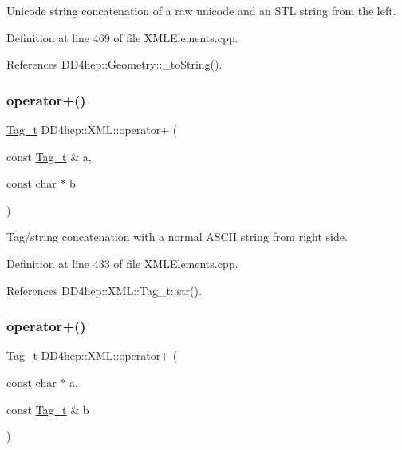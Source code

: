 Unicode string concatenation of a raw unicode and an S\+TL string from the left. 



Definition at line 469 of file X\+M\+L\+Elements.\+cpp.



References D\+D4hep\+::\+Geometry\+::\+\_\+to\+String().

\hypertarget{group___d_d4_h_e_p___x_m_l_gacf5fdc46e1dad4d2935283ead3a4c0fd}{}\label{group___d_d4_h_e_p___x_m_l_gacf5fdc46e1dad4d2935283ead3a4c0fd} 
\subsubsection{\texorpdfstring{operator+()}{operator+()}\hspace{0.1cm}{\footnotesize\ttfamily [10/14]}}
{\footnotesize\ttfamily \hyperlink{class_d_d4hep_1_1_x_m_l_1_1_tag__t}{Tag\+\_\+t} D\+D4hep\+::\+X\+M\+L\+::operator+ (\begin{DoxyParamCaption}\item[{const \hyperlink{class_d_d4hep_1_1_x_m_l_1_1_tag__t}{Tag\+\_\+t} \&}]{a,  }\item[{const char $\ast$}]{b }\end{DoxyParamCaption})}



Tag/string concatenation with a normal A\+S\+C\+II string from right side. 



Definition at line 433 of file X\+M\+L\+Elements.\+cpp.



References D\+D4hep\+::\+X\+M\+L\+::\+Tag\+\_\+t\+::str().

\hypertarget{group___d_d4_h_e_p___x_m_l_ga16ba3dffdb36f1a0ae319fde7dcdb5ca}{}\label{group___d_d4_h_e_p___x_m_l_ga16ba3dffdb36f1a0ae319fde7dcdb5ca} 
\subsubsection{\texorpdfstring{operator+()}{operator+()}\hspace{0.1cm}{\footnotesize\ttfamily [11/14]}}
{\footnotesize\ttfamily \hyperlink{class_d_d4hep_1_1_x_m_l_1_1_tag__t}{Tag\+\_\+t} D\+D4hep\+::\+X\+M\+L\+::operator+ (\begin{DoxyParamCaption}\item[{const char $\ast$}]{a,  }\item[{const \hyperlink{class_d_d4hep_1_1_x_m_l_1_1_tag__t}{Tag\+\_\+t} \&}]{b }\end{DoxyParamCaption})}



